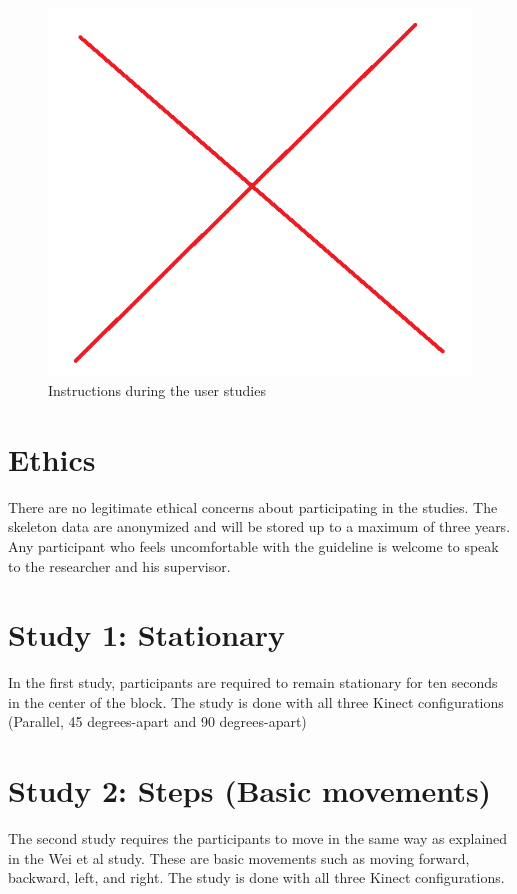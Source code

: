 \begin{figure}[!h]
  \centering
  \includegraphics[width=0.8\linewidth]{figs/studies_instruction}
  \caption{Instructions during the user studies}
  \label{fig:studies_instruction}
\end{figure}

\section{Ethics}
\label{sec:studies_ethics}

There are no legitimate ethical concerns about participating in the studies. The skeleton data are anonymized and will be stored up to a maximum of three years. Any participant who feels uncomfortable with the guideline is welcome to speak to the researcher and his supervisor.

\section{Study 1: Stationary}
\label{sec:studies_stationary}

In the first study, participants are required to remain stationary for ten seconds in the center of the block. The study is done with all three Kinect configurations (Parallel, 45 degrees-apart and 90 degrees-apart)

\section{Study 2: Steps (Basic movements)}
\label{sec:studies_stationary}

The second study requires the participants to move in the same way as explained in the Wei et al study. These are basic movements such as moving forward, backward, left, and right. The study is done with all three Kinect configurations.

